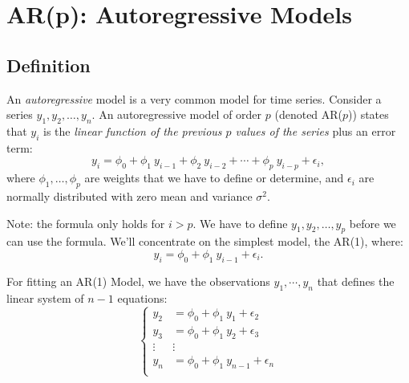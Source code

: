\documentclass[a4paper,11pt,oneside,onecolumn]{book}
\begin{document}
\chapter{AR(p): Autoregressive Models}
\label{chp:AR}


\section{Definition}
\vspace{.5cm}
\begin{definition}
An {\it autoregressive} model is a very common model for time
series. Consider a series $y_1, y_2,\ldots,y_n$. An autoregressive
model of order $p$ (denoted AR($p$)) states that $y_i$ is the {\it
linear function of the previous $p$ values of the series} plus an
error term:
\[ y_i = \phi_0 + \phi_1\ y_{i-1} + \phi_2\ y_{i-2} + \cdots + \phi_p\ y_{i-p} +
\epsilon_i, \] where $\phi_1,\ldots,\phi_p$ are weights that we
have to define or determine, and $\epsilon_i$ are normally
distributed with zero mean and variance $\sigma^2$. 

\end{definition}

Note: the formula only holds for $i > p$. We have to define $y_1,
y_2, \ldots, y_p$ before we can use the formula. 
 We'll concentrate on the simplest model, the AR(1), where:
\[ y_i = \phi_0 + \phi_1\ y_{i-1} + \epsilon_i. \]


For fitting an AR(1) Model, we have the observations $y_1,\cdots, y_n$ that defines the linear system of $n-1$ equations:
$$
\left\lbrace
\begin{array}{ll}
y_2&= \phi_0 + \phi_1\ y_1+\epsilon_2\\
y_3&= \phi_0 + \phi_1\ y_2+\epsilon_3\\
\vdots &\vdots \\
y_n&= \phi_0 + \phi_1\ y_{n-1}+\epsilon_{n}\\
\end{array}\right.
$$ 
\end{document}
